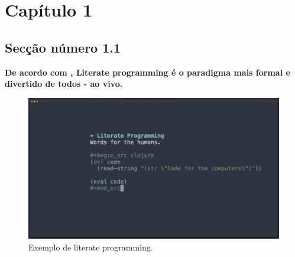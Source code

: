 \documentclass[
12pt, a4paper,%
openright,%
oneside,%
english,
brazil	%
]{abntex2}
\begin{document}

\chapter{Capítulo 1}
\section{Secção número 1.1}

\textbf{De acordo com \cite{foo}, Literate programming
  é o paradigma mais formal e divertido de todos - ao vivo.}

\begin{figure}[ht]
  \centering
  \caption{\label{fig:lt1} Exemplo de literate programming.}
  \includegraphics[width=\linewidth]{../img/literate-programming.jpg}
\end{figure}

\lipsum[1-2] %

\end{document}
